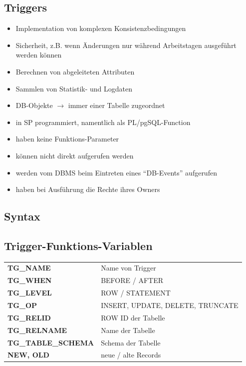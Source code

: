 \documentclass[a4paper, landscape, 8pt]{scrartcl}
\begin{document}
\begin{multicols*}{4}
        \section{Triggers}
        \begin{itemize}
            \item Implementation von komplexen Konsistenzbedingungen
            \item Sicherheit, z.B. wenn Änderungen nur während Arbeitstagen ausgeführt werden können
            \item Berechnen von abgeleiteten Attributen
            \item Sammlen von Statistik- und Logdaten
            \item DB-Objekte $\to$ immer einer Tabelle zugeordnet
            \item in SP programmiert, namentlich als PL/pgSQL-Function
            \item haben keine Funktions-Parameter
            \item können nicht direkt aufgerufen werden
            \item werden vom DBMS beim Eintreten eines \enquote{DB-Events} aufgerufen
            \item haben bei Ausführung die Rechte ihres Owners
        \end{itemize}

        \subsection{Syntax}

        \subsection{Trigger-Funktions-Variablen}
        \begin{tabularx}{\columnwidth}{l | X}
            \textbf{TG\_NAME} & Name von Trigger \\
            \textbf{TG\_WHEN} & BEFORE / AFTER \\
            \textbf{TG\_LEVEL} & ROW / STATEMENT \\
            \textbf{TG\_OP} & INSERT, UPDATE, DELETE, TRUNCATE \\
            \textbf{TG\_RELID} & ROW ID der Tabelle \\
            \textbf{TG\_RELNAME} & Name der Tabelle \\
            \textbf{TG\_TABLE\_SCHEMA} & Schema der Tabelle \\
            \textbf{NEW, OLD} & neue / alte Records
        \end{tabularx}


\end{multicols*}
\end{document}
